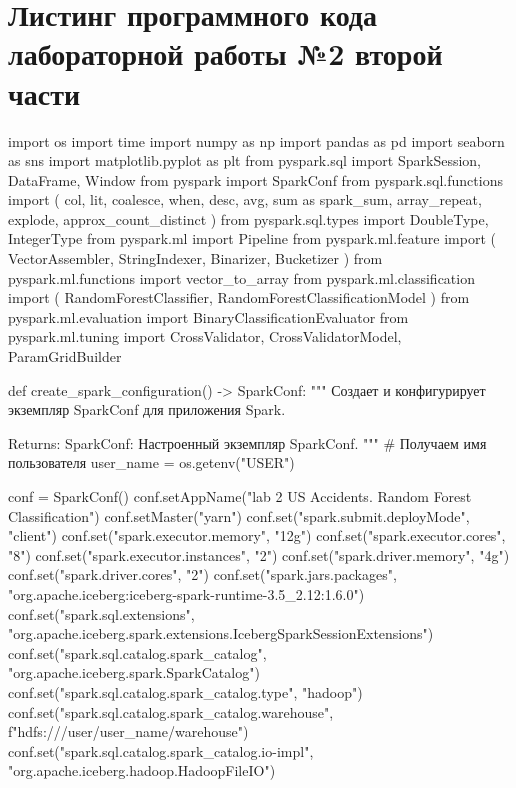 \chapter{Листинг программного кода лабораторной работы №2 второй части}\label{app:D}\vspace{\baselineskip}

\begin{code}
import os
import time
import numpy as np
import pandas as pd
import seaborn as sns
import matplotlib.pyplot as plt
from pyspark.sql import SparkSession, DataFrame, Window
from pyspark import SparkConf
from pyspark.sql.functions import (
    col, lit, coalesce, when, desc, avg, sum as spark_sum,
    array_repeat, explode, approx_count_distinct
)
from pyspark.sql.types import DoubleType, IntegerType
from pyspark.ml import Pipeline
from pyspark.ml.feature import (
    VectorAssembler,
    StringIndexer,
    Binarizer,
    Bucketizer
)
from pyspark.ml.functions import vector_to_array
from pyspark.ml.classification import (
    RandomForestClassifier,
    RandomForestClassificationModel
)
from pyspark.ml.evaluation import BinaryClassificationEvaluator
from pyspark.ml.tuning import CrossValidator, CrossValidatorModel, ParamGridBuilder

def create_spark_configuration() -> SparkConf:
    """
    Создает и конфигурирует экземпляр SparkConf для приложения Spark.

    Returns:
        SparkConf: Настроенный экземпляр SparkConf.
    """
    # Получаем имя пользователя
    user_name = os.getenv("USER")

    conf = SparkConf()
    conf.setAppName("lab 2 US Accidents. Random Forest Classification")
    conf.setMaster("yarn")
    conf.set("spark.submit.deployMode", "client")
    conf.set("spark.executor.memory", "12g")
    conf.set("spark.executor.cores", "8")
    conf.set("spark.executor.instances", "2")
    conf.set("spark.driver.memory", "4g")
    conf.set("spark.driver.cores", "2")
    conf.set("spark.jars.packages",
             "org.apache.iceberg:iceberg-spark-runtime-3.5_2.12:1.6.0")
    conf.set("spark.sql.extensions",
             "org.apache.iceberg.spark.extensions.IcebergSparkSessionExtensions")
    conf.set("spark.sql.catalog.spark_catalog",
             "org.apache.iceberg.spark.SparkCatalog")
    conf.set("spark.sql.catalog.spark_catalog.type", "hadoop")
    conf.set("spark.sql.catalog.spark_catalog.warehouse",
             f"hdfs:///user/{user_name}/warehouse")
    conf.set("spark.sql.catalog.spark_catalog.io-impl",
             "org.apache.iceberg.hadoop.HadoopFileIO")


\end{code}

